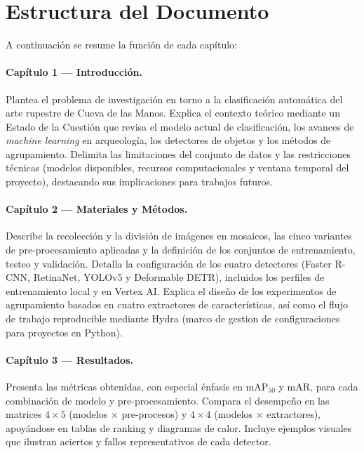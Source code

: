 \section{Estructura del Documento}\label{sec:estructura_documento}

A continuación se resume la función de cada capítulo:

\paragraph{Capítulo 1 — Introducción.}
Plantea el problema de investigación en torno a la clasificación automática del arte rupestre de Cueva de las Manos.
Explica el contexto teórico mediante un Estado de la Cuestión que revisa el modelo actual de clasificación, los avances de \textit{machine learning} en arqueología, los detectores de objetos y los métodos de agrupamiento.
Delimita las limitaciones del conjunto de datos y las restricciones técnicas (modelos disponibles, recursos computacionales y ventana temporal del proyecto), destacando sus implicaciones para trabajos futuros.

\paragraph{Capítulo 2 — Materiales y Métodos.}
Describe la recolección y la división de imágenes en mosaicos, las cinco variantes de pre-procesamiento aplicadas y la definición de los conjuntos de entrenamiento, testeo y validación.
Detalla la configuración de los cuatro detectores (Faster R-CNN, RetinaNet, YOLOv5 y Deformable DETR), incluidos los perfiles de entrenamiento local y en Vertex AI.
Explica el diseño de los experimentos de agrupamiento basados en cuatro extractores de características, así como el flujo de trabajo reproducible mediante Hydra (marco de gestion de configuraciones para proyectos en Python).

\paragraph{Capítulo 3 — Resultados.}
Presenta las métricas obtenidas, con especial énfasis en \(\mathrm{mAP}_{50}\) y \(\mathrm{mAR}\), para cada combinación de modelo y pre-procesamiento.
Compara el desempeño en las matrices \(4\times5\) (modelos × pre-procesos) y \(4\times4\) (modelos × extractores), apoyándose en tablas de ranking y diagramas de calor.
Incluye ejemplos visuales que ilustran aciertos y fallos representativos de cada detector.

